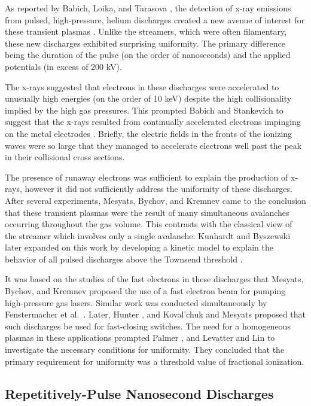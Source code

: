 As reported by Babich, Loika, and Tarasova \cite{Babich1977}, the detection of
x-ray emissions from pulsed, high-pressure, helium discharges created a new
avenue of interest for these transient plasmas \cite{Stankevich1967,
Noggle1968}. Unlike the streamers, which were often filamentary, these new
discharges exhibited surprising uniformity. The primary difference being the
duration of the pulse (on the order of nanoseconds) and the applied potentials
(in excess of 200 kV).

The x-rays suggested that electrons in these discharges were accelerated to
unusually high energies (on the order of 10 keV) despite the high collisionality
implied by the high gas pressures. This prompted Babich and Stankevich to
suggest that the x-rays resulted from continually accelerated electrons
impinging on the metal electrodes \cite{Babich1973}. Briefly, the electric
fields in the fronts of the ionizing waves were so large that they managed to
accelerate electrons well past the peak in their collisional cross sections.

The presence of runaway electrons was sufficient to explain the production of
x-rays, however it did not sufficiently address the uniformity of these
discharges. After several experiments, Mesyats, Bychov, and Kremnev came to the
conclusion that these transient plasmas were the result of many simultaneous
avalanches occurring throughout the gas volume. This contrasts with the
classical view of the streamer which involves only a single avalanche. Kunhardt
and Byszewski later expanded on this work by developing a kinetic model to
explain the behavior of all pulsed discharges above the Townsend threshold
\cite{Kunhardt1980}.

It was based on the studies of the fast electrons in these discharges that
Mesyats, Bychov, and Kremnev proposed the use of a fast electron beam for
pumping high-pressure gas lasers. Similar work was conducted simultaneously by
Fenstermacher et al.~\cite{Fenstermacher1972}. Later, Hunter \cite{Hunter1976},
and Koval'chuk and Mesyats \cite{Koval'chuk1976} proposed that such discharges
be used for fast-closing switches. The need for a homogeneous plasmas in these
applications prompted Palmer \cite{Palmer1974}, and Levatter and Lin
\cite{Levatter1980} to investigate the necessary conditions for uniformity. They
concluded that the primary requirement for uniformity was a threshold value of
fractional ionization.

\subsection{Repetitively-Pulse Nanosecond Discharges}

